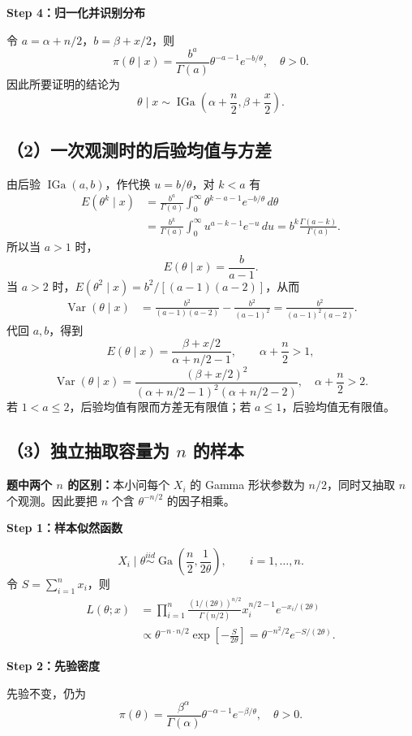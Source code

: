 \documentclass[UTF8,zihao=-4]{ctexart}
\newcommand{\step}[1]{\par\medskip\noindent\textbf{#1}\par\nopagebreak}
\newcommand{\Ga}{\operatorname{Ga}}
\newcommand{\IGa}{\operatorname{IGa}}
\newcommand{\Var}{\operatorname{Var}}
\begin{document}
\step{Step 4：归一化并识别分布}
令 $a=\alpha+n/2$，$b=\beta+x/2$，则
\[
\pi(\theta\mid x)=\frac{b^a}{\Gamma(a)}\theta^{-a-1}e^{-b/\theta},\quad\theta>0.
\]
因此所要证明的结论为
\[
\boxed{\theta\mid x\sim\IGa\left(\alpha+\frac n2,\beta+\frac x2\right).}
\]

\subsection*{（2）一次观测时的后验均值与方差}
由后验 $\IGa(a,b)$，作代换 $u=b/\theta$，对 $k<a$ 有
\begin{align*}
E(\theta^k\mid x)
&=\frac{b^a}{\Gamma(a)}\int_0^\infty
\theta^{k-a-1}e^{-b/\theta}\,d\theta\\
&=\frac{b^k}{\Gamma(a)}\int_0^\infty u^{a-k-1}e^{-u}\,du
=b^k\frac{\Gamma(a-k)}{\Gamma(a)}.
\end{align*}
所以当 $a>1$ 时，
\[
E(\theta\mid x)=\frac b{a-1}.
\]
当 $a>2$ 时，$E(\theta^2\mid x)=b^2/[(a-1)(a-2)]$，从而
\begin{align*}
\Var(\theta\mid x)
&=\frac{b^2}{(a-1)(a-2)}-\frac{b^2}{(a-1)^2}
=\frac{b^2}{(a-1)^2(a-2)}.
\end{align*}
代回 $a,b$，得到
\[
\boxed{E(\theta\mid x)=\frac{\beta+x/2}{\alpha+n/2-1},
\qquad\alpha+\frac n2>1,}
\]
\[
\boxed{\Var(\theta\mid x)=
\frac{(\beta+x/2)^2}{(\alpha+n/2-1)^2(\alpha+n/2-2)},
\quad\alpha+\frac n2>2.}
\]
若 $1<a\leq2$，后验均值有限而方差无有限值；若 $a\leq1$，后验均值无有限值。

\subsection*{（3）独立抽取容量为 $n$ 的样本}
\textbf{题中两个 $n$ 的区别：}本小问每个 $X_i$ 的 Gamma 形状参数为 $n/2$，同时又抽取 $n$ 个观测。因此要把 $n$ 个含 $\theta^{-n/2}$ 的因子相乘。

\step{Step 1：样本似然函数}
\[
X_i\mid\theta\overset{iid}{\sim}\Ga\left(\frac n2,\frac1{2\theta}\right),
\qquad i=1,\ldots,n.
\]
令 $S=\sum_{i=1}^n x_i$，则
\begin{align*}
L(\theta;x)
&=\prod_{i=1}^n\frac{(1/(2\theta))^{n/2}}{\Gamma(n/2)}
x_i^{n/2-1}e^{-x_i/(2\theta)}\\
&\propto\theta^{-n\cdot n/2}\exp\left[-\frac S{2\theta}\right]
=\theta^{-n^2/2}e^{-S/(2\theta)}.
\end{align*}

\step{Step 2：先验密度}
先验不变，仍为
\[
\pi(\theta)=\frac{\beta^\alpha}{\Gamma(\alpha)}
\theta^{-\alpha-1}e^{-\beta/\theta},\quad\theta>0.
\]
\end{document}

